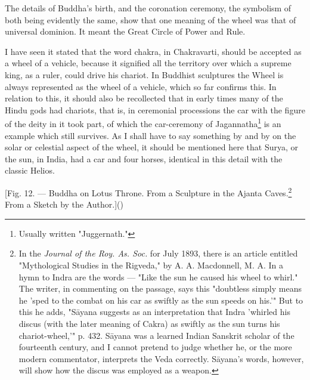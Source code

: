 \documentclass[a4paper, 11pt, oneside, polutonikogreek, english]{article}
\begin{document}
The details of Buddha's birth, and the coronation ceremony, the symbolism of both being evidently the same, show that one meaning of the wheel was that of universal dominion. It meant the Great Circle of Power and Rule.

I have seen it stated that the word chakra, in Chakravarti, should be accepted as a wheel of a vehicle, because it signified all the territory over which a supreme king, as a ruler, could drive his chariot. In Buddhist sculptures the Wheel is always represented as the wheel of a vehicle, which so far confirms this. In relation to this, it should also be recollected that in early times many of the Hindu gods had chariots, that is, in ceremonial processions the car with the figure of the deity in it took part, of which the car-ceremony of Jagannatha\footnote{Usually written "Juggernath."} is an example which still survives. As I shall have to say something by and by on the solar or celestial aspect of the wheel, it should be mentioned here that Surya, or the sun, in India, had a car and four horses, identical in this detail with the classic Helios.

[Fig. 12. --- Buddha on Lotus Throne. From a Sculpture in the Ajanta Caves.\footnote{In the \emph{Journal of the Roy. As. Soc.} for July 1893, there is an article entitled "Mythological Studies in the Rigveda," by A. A. Macdonnell, M. A. In a hymn to Indra are the words --- "Like the sun he caused his wheel to whirl." The writer, in commenting on the passage, says this "doubtless simply means he 'sped to the combat on his car as swiftly as the sun speeds on his.'" But to this he adds, "Sāyana suggests as an interpretation that Indra 'whirled his discus (with the later meaning of Cakra) as swiftly as the sun turns his chariot-wheel,'" p. 432. Sāyana was a learned Indian Sanskrit scholar of the fourteenth century, and I cannot pretend to judge whether he, or the more modern commentator, interprets the Veda correctly. Sāyana's words, however, will show how the discus was employed as a weapon.} From a Sketch by the Author.]()
\end{document}
